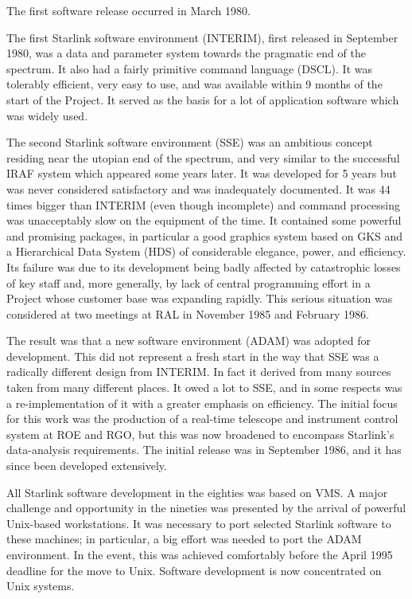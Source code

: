 \documentclass[twoside,11pt]{article}
\begin{document}
The first software release occurred in March 1980.

The first Starlink software environment (INTERIM), first released in
September 1980, was a data and parameter system towards the pragmatic end of
the spectrum.
It also had a fairly primitive command language (DSCL).
It was tolerably efficient, very easy to use, and was available within 9
months of the start of the Project.
It served as the basis for a lot of application software which was widely
used.

The second Starlink software environment (SSE) was an ambitious
concept residing near the utopian end of the spectrum, and very similar to the
successful IRAF system which appeared some years later.
It was developed for 5 years but was never considered satisfactory and was
inadequately documented.
It was 44 times bigger than INTERIM (even though incomplete) and command
processing was unacceptably slow on the equipment of the time.
It contained some powerful and promising packages, in particular a good
graphics system based on GKS and a Hierarchical Data System (HDS) of
considerable elegance, power, and efficiency.
Its failure was due to its development being badly affected by catastrophic
losses of key staff and, more generally, by lack of central programming
effort in a Project whose customer base was expanding rapidly.
This serious situation was considered at two meetings at RAL in November 1985
and February 1986.

The result was that a new software environment (ADAM) was adopted for
development.
This did not represent a fresh start in the way that SSE was a
radically different design from INTERIM.
In fact it derived from many sources taken from many different places.
It owed a lot to SSE, and in some respects was a re-implementation
of it with a greater emphasis on efficiency.
The initial focus for this work was the production of a real-time telescope
and instrument control system at ROE and RGO, but this was now broadened to
encompass Starlink's data-analysis requirements.
The initial release was in September 1986, and it has since been developed
extensively.

All Starlink software development in the eighties was based on VMS.
A major challenge and opportunity in the nineties was presented by the arrival
of powerful Unix-based workstations.
It was necessary to port selected Starlink software to these machines; in
particular, a big effort was needed to port the ADAM environment.
In the event, this was achieved comfortably before the April 1995 deadline for
the move to Unix.
Software development is now concentrated on Unix systems.
\end{document}
